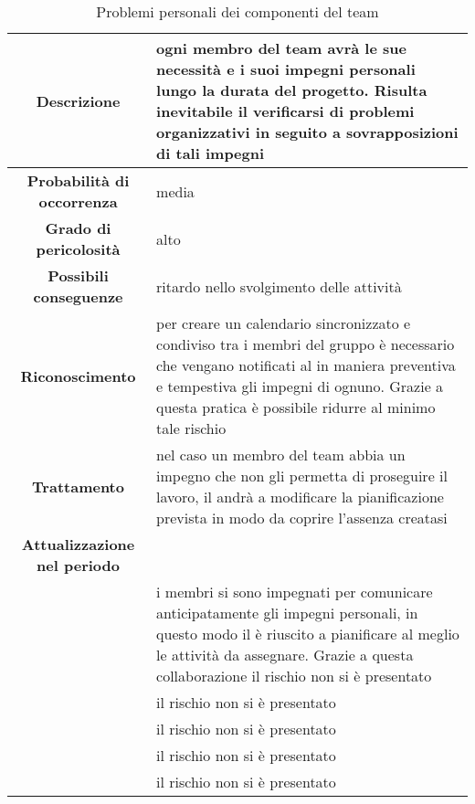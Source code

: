 \documentclass[PianoDiProgetto.tex]{subfiles}
\begin{document}
\begin{table}[h]
		\begin{center}
			\begin{tabular}{ | c | p{10cm} |}
				\hline


		 \textbf{Descrizione} & ogni membro del team avrà le sue necessità e i suoi impegni personali lungo la durata del progetto. Risulta inevitabile il verificarsi di problemi organizzativi in seguito a sovrapposizioni di tali impegni \\ \hline
		 \textbf{Probabilità di occorrenza} & media \\ \hline
		 \textbf{Grado di pericolosità} & alto \\ \hline
		 \textbf{Possibili conseguenze} & ritardo nello svolgimento delle attività \\ \hline
		 \textbf{Riconoscimento} &  per creare un calendario sincronizzato e condiviso tra i membri del gruppo è necessario che vengano notificati al \RESP{} in maniera preventiva e tempestiva gli impegni di ognuno. Grazie a questa pratica è possibile ridurre al minimo tale rischio \\ \hline
		 \textbf{Trattamento} & nel caso un membro del team abbia un impegno che non gli permetta di proseguire il lavoro, il \RESP{} andrà a modificare la pianificazione prevista in modo da coprire l'assenza creatasi \\ \hline
		 \textbf{Attualizzazione nel periodo}&

				\\ \hline \textbf{\PerAR} & i membri si sono impegnati per comunicare anticipatamente gli impegni personali, in questo modo il \RESP{} è riuscito a pianificare al meglio le attività da assegnare. Grazie a questa collaborazione il rischio non si è presentato
				\\ \hline \textbf{\PerAD}& il rischio non si è presentato
				\\ \hline \textbf{\PerPA}& il rischio non si è presentato
				\\ \hline \textbf{\PerPD}& il rischio non si è presentato \\ \hline
				\textbf{\PerC}& il rischio non si è presentato \\ \hline
\end{tabular}
		\caption{Problemi personali dei componenti del team}
		\end{center}
	\end{table}

\clearpage
\end{document}
